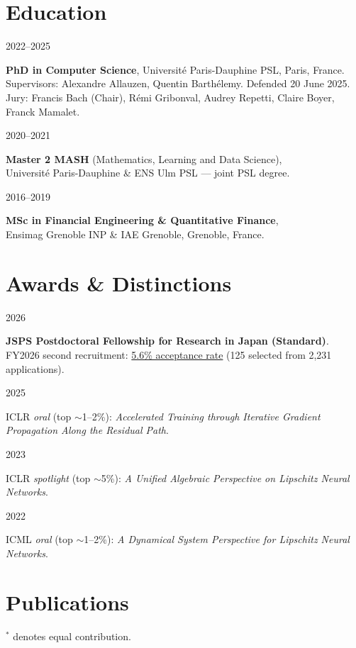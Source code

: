 \documentclass[10pt,a4paper]{article}
\newcommand{\cv}[2]{%
  \noindent\begin{minipage}[t]{0.135\textwidth}%
    \strut\raggedright\small\color{dategray} #1%
  \end{minipage}%
  \hspace{0.015\textwidth}%
  \begin{minipage}[t]{0.845\textwidth}%
    \strut #2%
  \end{minipage}\par\vspace{5pt}%
}
\begin{document}
\section{Education}
\cv{2022–2025}{\textbf{PhD in Computer Science}, Université Paris-Dauphine PSL, Paris, France.\\
    Supervisors: Alexandre Allauzen, Quentin Barthélemy. Defended 20 June 2025.\\
    Jury: Francis Bach (Chair), Rémi Gribonval, Audrey Repetti, Claire Boyer, Franck Mamalet.}
\cv{2020–2021}{\textbf{Master 2 MASH} (Mathematics, Learning and Data Science),\\
    Université Paris-Dauphine \& ENS Ulm PSL — joint PSL degree.}
\cv{2016–2019}{\textbf{MSc in Financial Engineering \& Quantitative Finance},\\
    Ensimag Grenoble INP \& IAE Grenoble, Grenoble, France.}

\section{Awards \& Distinctions}
\cv{2026}{\textbf{JSPS Postdoctoral Fellowship for Research in Japan (Standard)}.\\
    FY2026 second recruitment: \href{https://www.jsps.go.jp/english/e-fellow/e-ippan/adoption/2026.html}{5.6\% acceptance rate} (125 selected from 2,231 applications).}
\cv{2025}{ICLR \emph{oral} (top $\sim$1–2\%): \textit{Accelerated Training through Iterative Gradient Propagation Along the Residual Path}.}
\cv{2023}{ICLR \emph{spotlight} (top $\sim$5\%): \textit{A Unified Algebraic Perspective on Lipschitz Neural Networks}.}
\cv{2022}{ICML \emph{oral} (top $\sim$1–2\%): \textit{A Dynamical System Perspective for Lipschitz Neural Networks}.}

\newpage
\section{Publications}
{\small $^{*}$ denotes equal contribution.}
\vspace{6pt}
\end{document}
